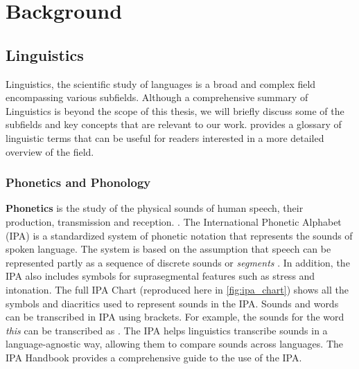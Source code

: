 \chapter{Background}\label{chapter:background}

\section{Linguistics}
Linguistics, the scientific study of languages is a broad and complex field encompassing various subfields. Although a comprehensive summary 
of Linguistics is beyond the scope of this thesis, we will briefly discuss some of the subfields and key concepts that are relevant to our work.
\cite{trask2007language} provides a glossary of linguistic terms that can be useful for readers interested in a more detailed overview of the field.

\subsection{Phonetics and Phonology}
\textbf{Phonetics} is the study of the physical sounds of human speech, their production, transmission and reception. \cite{trask2007language}. 
The International Phonetic Alphabet (IPA) is a standardized system of phonetic notation that represents the sounds of spoken language. The system
is based on the assumption that speech can be represented partly as a sequence of discrete sounds or \textit{segments} \cite{handbookIPA1999}. 
In addition, the IPA also includes symbols for suprasegmental features such as stress and intonation. The full IPA Chart (reproduced here in 
\ref{fig:ipa_chart}) shows all the symbols and diacritics used to represent sounds in the IPA. Sounds and words can be transcribed in IPA 
using \textipa{[ ]} brackets. For example, the sounds for the word \textit{this} can be transcribed as \textipa{[DIs]}. The IPA helps linguistics
transcribe sounds in a language-agnostic way, allowing them to compare sounds across languages. The IPA Handbook \cite{handbookIPA1999} provides
a comprehensive guide to the use of the IPA.

